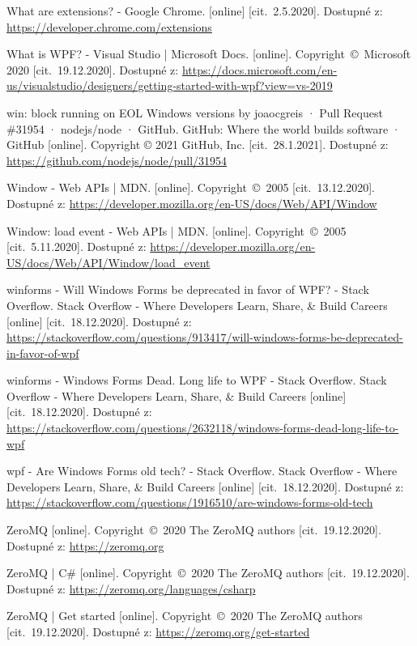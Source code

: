 \begin{thebibliography}{99}
 What are extensions? - Google Chrome. [online] [cit.~2.5.2020]. Dostupné z: \url{https://developer.chrome.com/extensions}

 What is WPF? - Visual Studio | Microsoft Docs. [online]. Copyright~©~Microsoft 2020 [cit.~19.12.2020]. Dostupné z: \url{https://docs.microsoft.com/en-us/visualstudio/designers/getting-started-with-wpf?view=vs-2019}

win: block running on EOL Windows versions by joaocgreis · Pull Request \#31954 · nodejs/node · GitHub. GitHub: Where the world builds software · GitHub [online]. Copyright © 2021 GitHub, Inc. [cit.~28.1.2021]. Dostupné z: \url{https://github.com/nodejs/node/pull/31954}

 Window - Web APIs | MDN. [online]. Copyright~©~2005 [cit.~13.12.2020]. Dostupné z: \url{https://developer.mozilla.org/en-US/docs/Web/API/Window}

 Window: load event - Web APIs | MDN. [online]. Copyright~©~2005 [cit.~5.11.2020]. Dostupné z: \url{https://developer.mozilla.org/en-US/docs/Web/API/Window/load_event}

 winforms - Will Windows Forms be deprecated in favor of WPF? - Stack Overflow. Stack Overflow - Where Developers Learn, Share, \& Build Careers [online] [cit.~18.12.2020]. Dostupné z: \url{https://stackoverflow.com/questions/913417/will-windows-forms-be-deprecated-in-favor-of-wpf}

 winforms - Windows Forms Dead. Long life to WPF - Stack Overflow. Stack Overflow - Where Developers Learn, Share, \& Build Careers [online] [cit.~18.12.2020]. Dostupné z: \url{https://stackoverflow.com/questions/2632118/windows-forms-dead-long-life-to-wpf}

 wpf - Are Windows Forms old tech? - Stack Overflow. Stack Overflow - Where Developers Learn, Share, \& Build Careers [online] [cit.~18.12.2020]. Dostupné z: \url{https://stackoverflow.com/questions/1916510/are-windows-forms-old-tech}

 ZeroMQ [online]. Copyright~©~2020 The ZeroMQ authors [cit.~19.12.2020]. Dostupné z: \url{https://zeromq.org}

 ZeroMQ | C\# [online]. Copyright~©~2020 The ZeroMQ authors [cit.~19.12.2020]. Dostupné z: \url{https://zeromq.org/languages/csharp}

 ZeroMQ | Get started [online]. Copyright~©~2020 The ZeroMQ authors [cit.~19.12.2020]. Dostupné z: \url{https://zeromq.org/get-started}

\end{thebibliography}
\newpage